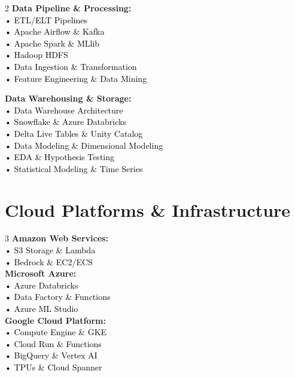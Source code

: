 \documentclass[10pt, letterpaper]{article}
\newcommand{\skillcat}[1]{%
    \textbf{\color{darkBlue}#1}%
}
\newcommand{\skillitem}[1]{%
    \textcolor{black}{#1}%
}
\begin{document}
\begin{tcolorbox}[colback=lightGray!50, colframe=accentColor, arc=3mm, boxrule=1pt]
\begin{multicols}{2}
\skillcat{Data Pipeline \& Processing:} \\
\skillitem{• ETL/ELT Pipelines} \\
\skillitem{• Apache Airflow \& Kafka} \\
\skillitem{• Apache Spark \& MLlib} \\
\skillitem{• Hadoop HDFS} \\
\skillitem{• Data Ingestion \& Transformation} \\
\skillitem{• Feature Engineering \& Data Mining} \\

\columnbreak

\skillcat{Data Warehousing \& Storage:} \\
\skillitem{• Data Warehouse Architecture} \\
\skillitem{• Snowflake \& Azure Databricks} \\
\skillitem{• Delta Live Tables \& Unity Catalog} \\
\skillitem{• Data Modeling \& Dimensional Modeling} \\
\skillitem{• EDA \& Hypothesis Testing} \\
\skillitem{• Statistical Modeling \& Time Series} \\
\end{multicols}
\end{tcolorbox}

\section{Cloud Platforms \& Infrastructure}

\begin{tcolorbox}[colback=lightBlue!10, colframe=primaryColor, arc=3mm, boxrule=1pt]
\begin{multicols}{3}
\skillcat{Amazon Web Services:} \\
\skillitem{• S3 Storage \& Lambda} \\
\skillitem{• Bedrock \& EC2/ECS} \\

\skillcat{Microsoft Azure:} \\
\skillitem{• Azure Databricks} \\
\skillitem{• Data Factory \& Functions} \\
\skillitem{• Azure ML Studio} \\

\skillcat{Google Cloud Platform:} \\
\skillitem{• Compute Engine \& GKE} \\
\skillitem{• Cloud Run \& Functions} \\
\skillitem{• BigQuery \& Vertex AI} \\
\skillitem{• TPUs \& Cloud Spanner} \\
\end{multicols}
\end{tcolorbox}
\end{document}
